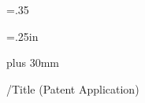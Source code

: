 \normalbaselineskip            %
\parskip=.35\baselineskip                     %

\hoffset=.25in                                %
\hsize=6in                                    %

\rightskip=0pt plus 30mm
\font

\pdfinfo
  { /Title (Patent Application) }

\font

